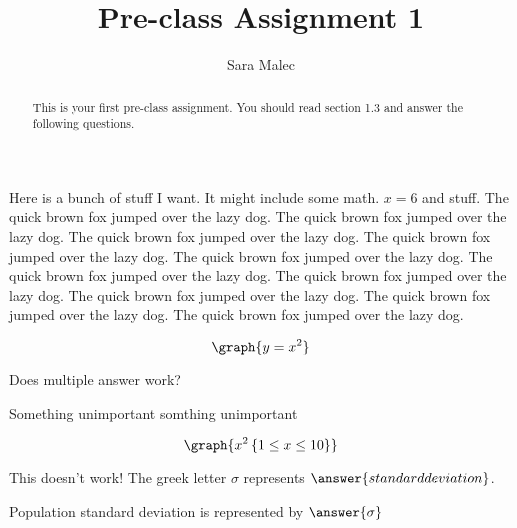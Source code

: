\documentclass[handout, space]{ximera}
\title{Pre-class Assignment 1}
\author{Sara Malec}
\begin{document}
\begin{abstract}
  This is your first pre-class assignment. You should read section 1.3 and answer the following questions.
\end{abstract}
\maketitle

\begin{leash}
Here is a bunch of stuff I want. It might include some math. $x=6$ and stuff.
The quick brown fox jumped over the lazy dog.
The quick brown fox jumped over the lazy dog.
The quick brown fox jumped over the lazy dog.
The quick brown fox jumped over the lazy dog.
The quick brown fox jumped over the lazy dog.
The quick brown fox jumped over the lazy dog.
The quick brown fox jumped over the lazy dog.
The quick brown fox jumped over the lazy dog.
The quick brown fox jumped over the lazy dog.
The quick brown fox jumped over the lazy dog.
\end{leash}


\begin{problem}

\[\graph{y=x^2}\]

\end{problem}

\begin{problem} Does multiple answer work?
\begin{selectAll}
\end{selectAll}
\end{problem}

\begin{problem}
\begin{foldable}
 Something unimportant  somthing
unimportant 
\end{foldable}
   \[ 
   \graph{x^2 \left\{ 1 \leq x \leq 10 \right\} }
   \]
\end{problem}

\begin{problem}


    This doesn't work!  The greek letter $\sigma$ represents $\answer{standard deviation}$.
\end{problem}

\begin{problem}
    Population standard deviation is represented by $\answer{\sigma}$
\end{problem}
\end{document}
